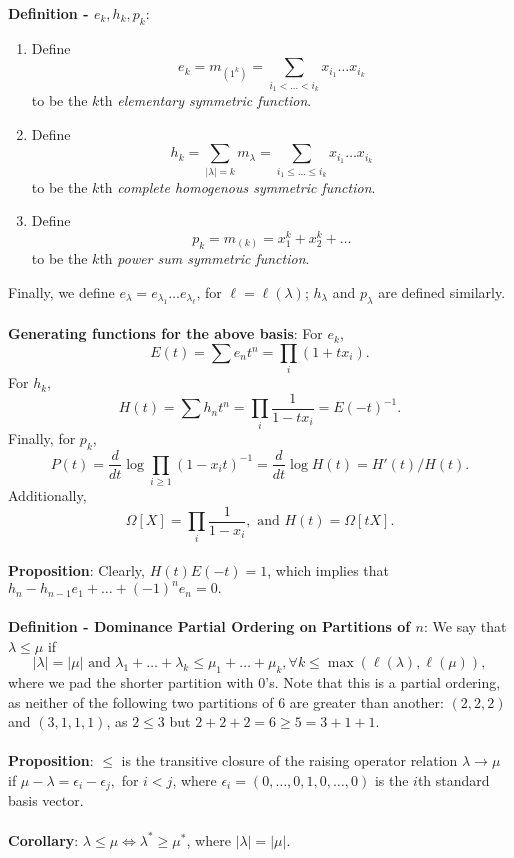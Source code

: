 \documentclass{article}
\begin{document}
\textbf{Definition - $e_k, h_k, p_k$}: \begin{enumerate}
    \item Define $$e_k = m_{(1^k)} = \sum_{i_1 < \dots < i_k} x_{i_1} \dots x_{i_k}$$ to be the $k$th \textit{elementary symmetric function}.
    \item Define $$h_k = \sum_{|\lambda| = k} m_\lambda = \sum_{i_1 \leq \dots \leq i_k} x_{i_1} \dots x_{i_k}$$ to be the $k$th \textit{complete homogenous symmetric function}.
    \item Define $$p_k = m_{(k)} = x_1^k + x_2^k + \dots$$ to be the $k$th \textit{power sum symmetric function}.
\end{enumerate} Finally, we define $e_\lambda = e_{\lambda_1} \dots e_{\lambda_\ell}$, for $\ell = \ell(\lambda)$; $h_\lambda$ and $p_\lambda$ are defined similarly. \\ \\
\textbf{Generating functions for the above basis}: For $e_k$, $$E(t) = \sum e_n t^n = \prod_i (1 + tx_i).$$ For $h_k$, $$H(t) = \sum h_n t^n = \prod_i \frac{1}{1 - tx_i} = E(-t)^{-1}.$$ Finally, for $p_k$, $$P(t) = \frac{d}{dt}\log{\prod_{i \geq 1} (1 - x_it)^{-1}} = \frac{d}{dt}\log{H(t)} = H'(t)/H(t).$$ Additionally, $$\Omega[X] = \prod_i \frac{1}{1 - x_i}, \text{ and } H(t) = \Omega[tX].$$ \\
\textbf{Proposition}: Clearly, $H(t)E(-t) = 1$, which implies that $h_n - h_{n - 1}e_1 + \dots + (-1)^n e_n = 0.$ \\ \\
\textbf{Definition - Dominance Partial Ordering on Partitions of $n$}: We say that $\lambda \leq \mu$ if $$|\lambda| = |\mu| \text{ and } \lambda_1 + \dots + \lambda_k \leq \mu_1 + \dots + \mu_k, \forall k \leq \max(\ell(\lambda), \ell(\mu)),$$ where we pad the shorter partition with 0's. Note that this is a partial ordering, as neither of the following two partitions of 6 are greater than another: $(2, 2, 2)$ and $(3, 1, 1, 1)$, as $2 \leq 3$ but $2 + 2 + 2 = 6 \geq 5 = 3 + 1 + 1$. \\ \\
\textbf{Proposition}: $\leq$ is the transitive closure of the raising operator relation $\lambda \rightarrow \mu$ if $\mu - \lambda = \epsilon_i - \epsilon_j,$ for $i < j$, where $\epsilon_i = (0, \dots, 0, 1, 0, \dots, 0)$ is the $i$th standard basis vector. \\ \\
\textbf{Corollary}: $\lambda \leq \mu \iff \lambda^* \geq \mu^*$, where $|\lambda| = |\mu|$. \\ \\
\end{document}
